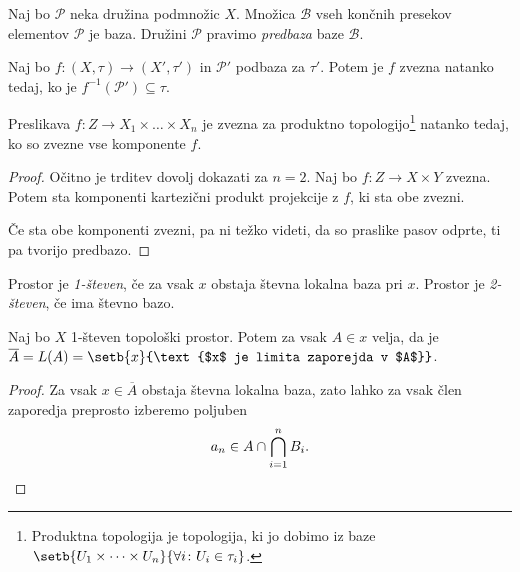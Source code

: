 \obvs

\begin{definicija}
Naj bo $\mathcal{P}$ neka družina podmnožic $X$. Množica
$\mathcal{B}$ vseh končnih presekov elementov $\mathcal{P}$ je
baza. Družini $\mathcal{P}$ pravimo
\emph{predbaza} baze $\mathcal{B}$.
\end{definicija}

\begin{trditev}
Naj bo $f \colon (X,\tau) \to (X',\tau')$ in $\mathcal{P}'$ podbaza
za $\tau'$. Potem je $f$ zvezna natanko tedaj, ko je
$f^{-1}(\mathcal{P}') \subseteq \tau$.
\end{trditev}

\obvs

\begin{trditev}
Preslikava $f \colon Z \to X_1 \times \dots \times X_n$ je zvezna
za produktno topologijo\footnote{Produktna topologija je
topologija, ki jo dobimo iz baze
$\setb{U_1 \times \dots \times U_n}
{\forall i \colon U_i \in \tau_i}$.}
natanko tedaj, ko so zvezne vse komponente
$f$.
\end{trditev}

\begin{proof}
Očitno je trditev dovolj dokazati za $n=2$. Naj bo
$f \colon Z \to X \times Y$ zvezna. Potem sta komponenti kartezični
produkt projekcije z $f$, ki sta obe zvezni.

Če sta obe komponenti zvezni, pa ni težko videti, da so praslike
pasov odprte, ti pa tvorijo predbazo.
\end{proof}

\begin{definicija}
Prostor je \emph{1-števen}, če
za vsak $x$ obstaja števna lokalna baza pri $x$. Prostor je
\emph{2-števen}, če ima števno bazo.
\end{definicija}

\begin{trditev}
Naj bo $X$ 1-števen topološki prostor. Potem za vsak $A \in x$
velja, da je $\overline{A} = L(A) =
\setb{x}{\text{$x$ je limita zaporejda v $A$}}$.
\end{trditev}

\begin{proof}
Za vsak $x \in \overline{A}$ obstaja števna lokalna baza, zato
lahko za vsak člen zaporedja preprosto izberemo poljuben
\[
a_n \in A \cap \bigcap_{i=1}^n B_i. \qedhere
\]
\end{proof}

